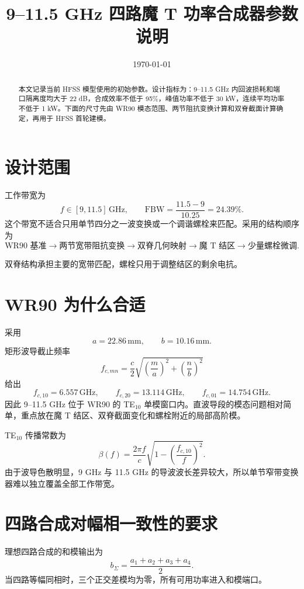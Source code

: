 \documentclass[11pt,a4paper]{ctexart}
\title{9--11.5 GHz 四路魔 T 功率合成器参数说明}
\author{}
\date{\today}
\begin{document}
\maketitle

\begin{abstract}
本文记录当前 HFSS 模型使用的初始参数。设计指标为：9--11.5 GHz 内回波损耗和端口隔离度均大于 22 dB，合成效率不低于 95\%，峰值功率不低于 30 kW，连续平均功率不低于 1 kW。下面的尺寸先由 WR90 模态范围、两节阻抗变换计算和双脊截面计算确定，再用于 HFSS 首轮建模。
\end{abstract}

\section{设计范围}

工作带宽为
\[
f\in[9,11.5]\,\mathrm{GHz},
\qquad
\mathrm{FBW}=\frac{11.5-9}{10.25}=24.39\%.
\]
这个带宽不适合只用单节四分之一波变换或一个调谐螺栓来匹配。采用的结构顺序为
\[
\boxed{
\text{WR90 基准}
\rightarrow
\text{两节宽带阻抗变换}
\rightarrow
\text{双脊几何映射}
\rightarrow
\text{魔 T 结区}
\rightarrow
\text{少量螺栓微调}
}.
\]

双脊结构承担主要的宽带匹配，螺栓只用于调整结区的剩余电抗。

\section{WR90 为什么合适}

采用
\[
a=22.86\,\mathrm{mm},
\qquad
b=10.16\,\mathrm{mm}.
\]
矩形波导截止频率
\[
f_{c,mn}
=
\frac{c}{2}
\sqrt{
\left(\frac{m}{a}\right)^2+
\left(\frac{n}{b}\right)^2
}
\]
给出
\[
f_{c,10}=6.557\,\mathrm{GHz},
\qquad
f_{c,20}=13.114\,\mathrm{GHz},
\qquad
f_{c,01}=14.754\,\mathrm{GHz}.
\]
因此 9--11.5 GHz 位于 WR90 的 TE$_{10}$ 单模窗口内。直波导段的模态问题相对简单，重点放在魔 T 结区、双脊截面变化和螺栓附近的局部高阶模。

TE$_{10}$ 传播常数为
\[
\beta(f)
=
\frac{2\pi f}{c}
\sqrt{1-\left(\frac{f_{c,10}}{f}\right)^2}.
\]
由于波导色散明显，9 GHz 与 11.5 GHz 的导波波长差异较大，所以单节窄带变换器难以独立覆盖全部工作带宽。

\section{四路合成对幅相一致性的要求}

理想四路合成的和模输出为
\[
b_\Sigma
=
\frac{a_1+a_2+a_3+a_4}{2}.
\]
当四路等幅同相时，三个正交差模均为零，所有可用功率进入和模端口。
\end{document}
